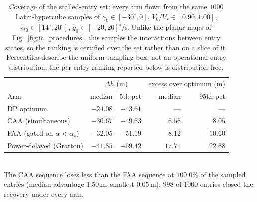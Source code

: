\begin{table}[H]
    \centering
    \caption{Coverage of the stalled-entry set: every arm flown from the same $1000$ Latin-hypercube samples of $\gamma_0 \in [-30^\circ, 0]$, $V_0/V_s \in [0.90, 1.00]$, $\alpha_0 \in [14^\circ, 20^\circ]$, $q_0 \in [-20, 20]^\circ$/s. Unlike the planar maps of Fig.~\ref{fig:ic_procedures}, this samples the interactions between entry states, so the ranking is certified over the set rather than on a slice of it. Percentiles describe the uniform sampling box, not an operational entry distribution; the per-entry ranking reported below is distribution-free.}
    \label{tab:montecarlo}
    \setlength{\tabcolsep}{14pt}\renewcommand{\arraystretch}{1.15}
    \begin{tabular}{lrrrr}
        \hline
        & \multicolumn{2}{c}{$\Delta h$ (m)} & \multicolumn{2}{c}{excess over optimum (m)} \\
        Arm & median & 5th pct & median & 95th pct \\
        \hline
        DP optimum & $-24.08$ & $-43.61$ & --- & --- \\
        CAA (simultaneous) & $-30.67$ & $-49.63$ & $6.56$ & $8.05$ \\
        FAA (gated on $\alpha < \alpha_s$) & $-32.05$ & $-51.19$ & $8.12$ & $10.60$ \\
        Power-delayed (Gratton) & $-41.85$ & $-59.42$ & $17.71$ & $22.68$ \\
        \hline
    \end{tabular}
    \\[2pt]
    \footnotesize The CAA sequence loses less than the FAA sequence at $100.0\%$ of the sampled entries (median advantage $1.50$\,m, smallest $0.05$\,m); $998$ of $1000$ entries closed the recovery under every arm.
\end{table}
